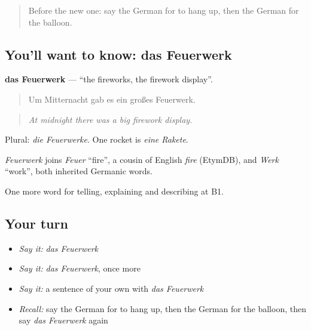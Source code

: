 \label{lesson:GE-C309-feuerwerk}



\begin{quote}
Before the new one: say the German for to hang up, then the German for the balloon.
\end{quote}

\subsection*{You'll want to know: das Feuerwerk}
\textbf{das Feuerwerk} — \textquotedblleft{}the fireworks, the firework display\textquotedblright{}.

\begin{quote}
Um Mitternacht gab es ein großes Feuerwerk.
\end{quote}

\begin{quote}
\emph{At midnight there was a big firework display.}
\end{quote}

Plural: \emph{die Feuerwerke}. One rocket is \emph{eine Rakete}.

\begin{cousinweb}
\emph{Feuerwerk} joins \emph{Feuer} \textquotedblleft{}fire\textquotedblright{}, a cousin of English \emph{fire} (EtymDB), and \emph{Werk} \textquotedblleft{}work\textquotedblright{}, both inherited Germanic words.
\end{cousinweb}

\begin{grammarlens}[title={What you've built}]
One more word for telling, explaining and describing at B1.
\end{grammarlens}

\subsection*{Your turn}
\begin{itemize}
\raggedright
  \item \emph{Say it:} \emph{das Feuerwerk}
  \item \emph{Say it:} \emph{das Feuerwerk}, once more
  \item \emph{Say it:} a sentence of your own with \emph{das Feuerwerk}
  \item \emph{Recall:} say the German for to hang up, then the German for the balloon, then say \emph{das Feuerwerk} again
\end{itemize}

